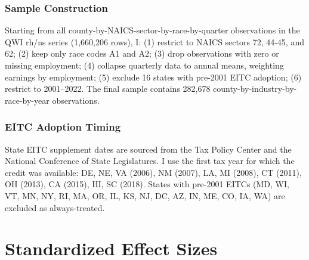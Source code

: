 \documentclass[12pt]{article}
\begin{document}
\subsubsection*{Sample Construction} Starting from all county-by-NAICS-sector-by-race-by-quarter observations in the QWI rh/ns series (1,660,206 rows), I: (1) restrict to NAICS sectors 72, 44-45, and 62; (2) keep only race codes A1 and A2; (3) drop observations with zero or missing employment; (4) collapse quarterly data to annual means, weighting earnings by employment; (5) exclude 16 states with pre-2001 EITC adoption; (6) restrict to 2001--2022. The final sample contains 282,678 county-by-industry-by-race-by-year observations.

\subsubsection*{EITC Adoption Timing} State EITC supplement dates are sourced from the Tax Policy Center and the National Conference of State Legislatures. I use the first tax year for which the credit was available: DE, NE, VA (2006), NM (2007), LA, MI (2008), CT (2011), OH (2013), CA (2015), HI, SC (2018). States with pre-2001 EITCs (MD, WI, VT, MN, NY, RI, MA, OR, IL, KS, NJ, DC, AZ, IN, ME, CO, IA, WA) are excluded as always-treated.

\section{Standardized Effect Sizes}
\label{sec:sde}


\end{document}

